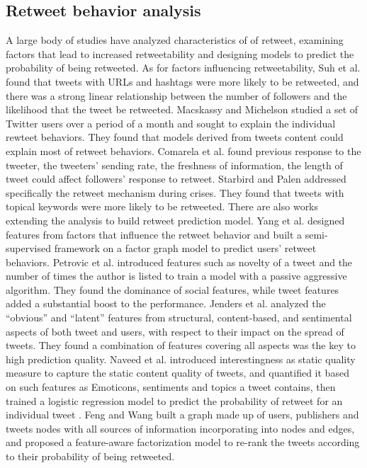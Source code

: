 \documentclass[preprint]{elsarticle}
\begin{document}
\subsection{Retweet behavior analysis}
A large body of studies have analyzed characteristics of of retweet, examining factors that lead to increased retweetability and designing models to predict the probability of being retweeted. 
As for factors influencing retweetability, Suh et al.\cite{Suh2010} found that tweets with URLs and hashtags were more likely to be retweeted, and there was a strong linear relationship between the number of followers and the likelihood that the tweet be retweeted. 
Macskassy and Michelson\cite{conf/icwsm/MacskassyM11} studied a set of Twitter users over a period of a month and sought to explain the individual rewteet behaviors.
They found that models derived from tweets content could explain most of retweet behaviors.
Comarela et al.\cite{Comarela:2012UFA} found previous response to the tweeter, the tweeters’ sending rate, the freshness of information, the length of tweet could affect followers’ response to retweet. Starbird and Palen\cite{Starbird:2012RRI} addressed specifically the retweet mechanism during crises. 
They found that tweets with topical keywords were more likely to be retweeted. 
There are also works extending the analysis to build retweet prediction model. 
Yang et al.\cite{conf/cikm/YangGCTLZS10} designed features from factors that influence the retweet behavior and built a semi-supervised framework on a factor graph model to predict users’ retweet behaviors. 
Petrovic et al.\cite{Osborne_Lavrenko_2011} introduced features such as novelty of a tweet and the number of times the author is listed to train a model with a passive aggressive algorithm. 
They found the dominance of social features, while tweet features added a substantial boost to the performance.
Jenders et al.\cite{Jenders:2013APV} analyzed the “obvious” and “latent” features from structural, content-based, and sentimental aspects of both tweet and users, with respect to their impact on the spread of tweets. 
They found a combination of features covering all aspects was the key to high prediction quality.
Naveed et al.\cite{Naveed:2011SMC,2011:NaveedGKC} introduced interestingness as static quality measure to capture the static content quality of tweets, and quantified it based on such features as Emoticons, sentiments and topics a tweet contains, then trained a logistic regression model to predict the probability of retweet for an individual tweet .
Feng and Wang\cite{conf/wsdm/FengW13} built a graph made up of users, publishers and tweets nodes with all sources of information incorporating into nodes and edges, and proposed a feature-aware factorization model to re-rank the tweets according to their probability of being retweeted.
\end{document}
